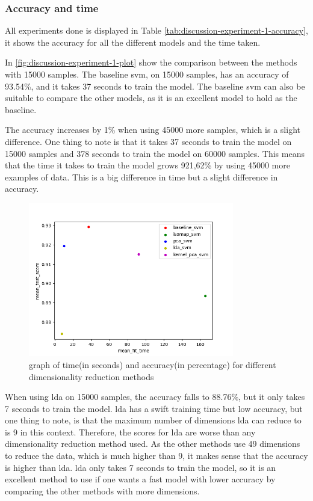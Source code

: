 \subsubsection{Accuracy and time}\label{subsec:discussion-experiment-1-accuracy}
All experiments done is displayed in Table \ref{tab:discussion-experiment-1-accuracy}, it shows the accuracy for all the different models and the time taken.


In \autoref{fig:discussion-experiment-1-plot} show the comparison between the methods with 15000 samples. The baseline \gls{svm}, on 15000 samples, has an accuracy of 93.54\%, and it takes 37 seconds to train the model. The baseline \gls{svm} can also be suitable to compare the other models, as it is an excellent model to hold as the baseline.

The accuracy increases by 1\% when using 45000 more samples, which is a slight difference. One thing to note is that it takes 37 seconds to train the model on 15000 samples and 378 seconds to train the model on 60000 samples. This means that the time it takes to train the model grows 921,62\% by using 45000 more examples of data. This is a big difference in time but a slight difference in accuracy.

\begin{figure}[htb!]
    \centering
    \includegraphics[width=0.8\textwidth]{figures/1-experiment/experiment1_plot.png}
    \caption{graph of time(in seconds) and accuracy(in percentage) for different dimensionality reduction methods}
    \label{fig:discussion-experiment-1-plot}
\end{figure}

When using \gls{lda} on 15000 samples, the accuracy falls to 88.76\%, but it only takes 7 seconds to train the model. \gls{lda} has a swift training time but low accuracy, but one thing to note, is that the maximum number of dimensions \gls{lda} can reduce to is 9 in this context. Therefore, the scores for \gls{lda} are worse than any dimensionality reduction method used. As the other methods use 49 dimensions to reduce the data, which is much higher than 9, it makes sense that the accuracy is higher than \gls{lda}. \gls{lda} only takes 7 seconds to train the model, so it is an excellent method to use if one wants a fast model with lower accuracy by comparing the other methods with more dimensions. 

